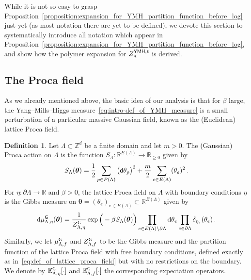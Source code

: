 \documentclass[11pt]{article}
\theoremstyle{definition}
\newtheorem{definition}[theorem]{Definition}
\theoremstyle{remark}
\numberwithin{theorem}{section}
\def\La{{\Lambda}}
\newcommand{\bR}{\mathbb R}
\newcommand{\bZ}{\mathbb Z}
\newcommand{\bE}{\mathbb E}
\begin{document}
    While it is not so easy to grasp Proposition~\ref{proposition:expansion_for_YMH_partition_function_before_log} just yet (as most notation there are yet to be defined), we devote this section to systematically introduce all notation which appear in Proposition~\ref{proposition:expansion_for_YMH_partition_function_before_log}, and show how the polymer expansion for $Z_{\Lambda}^{\sf YMH, s}$ is derived. 
    
    \subsection{The Proca field}
    As we already mentioned above, the basic idea of our analysis is that for $\beta$ large, the Yang--Mills--Higgs measure~\eqref{eq:intro-def_of_YMH_measure} is a small perturbation of a particular massive Gaussian field, known as the (Euclidean) lattice Proca field. 
    \begin{definition}
        \label{def:lattice_proca_field}
        Let $\Lambda\subset \bZ^d$ be a finite domain and let $m>0$. The (Gaussian) Proca action on $\Lambda$ is the function $S_{\Lambda} : \bR^{E(\Lambda)} \to \bR_{\ge 0}$ given by
        \begin{equation}
        \label{eq:def_of_gaussian_action}
            S_{\Lambda} (\boldsymbol{\theta}) = \frac{1}{2} \sum_{p\in P(\Lambda)} \big({\sf d}\theta_p\big)^2 + \frac{m}{2}\sum_{e\in E(\Lambda)} (\theta_e)^2 \, .    
        \end{equation}
        For $\eta:\partial \Lambda \to \bR$  and $\beta>0$, the lattice Proca field on $\Lambda$ with boundary conditions $\eta$ is the Gibbs measure on $\boldsymbol{\theta} = (\theta_e)_{e\in E(\Lambda)} \subset \bR^{E(\Lambda)}$ given by 
        \begin{equation}
        \label{eq:def_of_lattice_proca_field}
        {\rm d}\mu_{\Lambda,\eta}^{\sf G}(\boldsymbol{\theta}) = \frac{1}{Z_{\Lambda,\eta}^{\sf G}} \exp\Big( - \beta S_{\Lambda}(\boldsymbol{\theta})\Big) \prod_{e\in E(\Lambda) \setminus \partial \Lambda} {\rm d} \theta_e \prod_{e\in \partial \Lambda} \delta_{\eta_e}(\theta_e) \, .    
        \end{equation}
        Similarly, we let $\mu_{\Lambda,{f}}^{\sf G}$ and $Z_{\Lambda,f}^{\sf G}$ to be the Gibbs measure and the partition function of the lattice Proca field with free boundary conditions, defined exactly as in~\eqref{eq:def_of_lattice_proca_field} but with no restrictions on the boundary. We denote by $\bE_{\La,\eta}^{\sf G}[\cdot]$ and $\bE_{\La,f}^{\sf G}[\cdot ]$ the corresponding expectation operators. 
    \end{definition}
\end{document}
